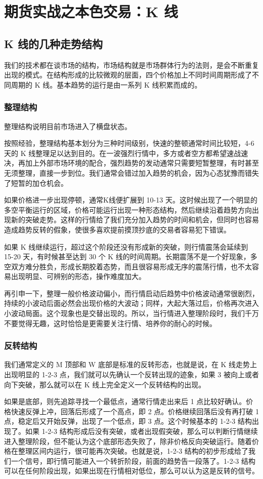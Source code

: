 \chapter{期货实战之本色交易：K 线}
\section{K 线的几种走势结构}
我们的技术都在谈市场的结构，市场结构就是市场群体行为的法则，是会不断重复出现的模式。在结构形成的比较微观的层面，四个价格加上不同时间周期形成了不同周期的 K 线。基本趋势的运行是由一系列 K 线积累而成的。
\subsection{整理结构}
整理结构说明目前市场进入了横盘状态。

按照经验，整理结构基本划分为三种时间级别，快速的整顿通常时间比较短，4-6 天的 K 线整理足以达到目的。在一波强烈行情中，多方或者空方都希望速战速决，再加上外部市场环境的配合，强烈趋势的发动通常只需要短暂整理，有时甚至无须整理，直接一步到位。我们通常会错过加入趋势的机会，因为心态犹豫而错失了短暂的加仓机会。

如果价格进一步出现停顿，通常K线便扩展到 10-13 天。这时候出现了一个明显的多空平衡运行的区域，价格可能运行出现一种形态结构，然后继续沿着趋势方向出现新的突破走势。这样的行情给了我们充分加入趋势的时间和机会，但同时也容易造成趋势反转的假象，使很多喜欢提前摸顶抄底的交易者容易犯下错误。

如果 K 线继续运行，超过这个阶段还没有形成新的突破，则行情震荡会延续到 15-20 天，有时候甚至达到 30 个 K 线的时间周期。长期震荡不是一个好现象，多空双方难分胜负，形成长期胶着态势，而且很容易形成无序的震荡行情，也不太容易出现明显、可辨别的形态，操作难度加大。

再引申一下，整理一般价格波动偏小，而行情启动后趋势中价格波动通常很剧烈，持续的小波动后面必然会出现价格的大波动；同样，大起大落过后，价格再次进入小波动局面。这个现象也是交替出现的。所以，当行情进入整理阶段时，我们千万不要觉得无趣，这时恰恰是更需要关注行情、培养你的耐心的时候。
\subsection{反转结构}
我们通常定义的 M 顶部和 W 底部是标准的反转形态，也就是说，在 K 线走势上出现明显的 1-2-3 点，我们就可以先确认一个反转出现的迹象，如果 3 被向上或者向下突破，那么就可以在 K 线上完全定义一个反转结构的出现。

如果是底部，则先追踪寻找一个最低点，通常行情走出来后 1 点比较好确认。价格快速反弹上冲，回落后形成了一个高点，即 2 点。价格继续回落后没有再打破 1 点，稳定后又开始反弹，出现了一个低点，即 3 点。这个时候基本的 1-2-3 结构出现了。如果 1-2-3 结构形成后没有突破，或者出现假突破，那么可以判断行情继续进入整理阶段，但不能认为这个底部形态失败了，除非价格反向突破运行。随着价格在整理区间内运行，很可能再次突破。也就是说，1-2-3 结构的初步形成给了我们一个信号，即行情可能进入一个转折阶段，前面的趋势告一段落了。1-2-3 结构可以在任何阶段出现，如果出现在行情相对低位，那么可以认为这是反转的信号。

